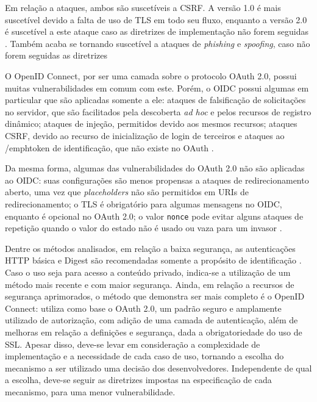 Em relação a ataques, ambos são suscetíveis a CSRF. A versão 1.0 é mais suscetível devido a 
falta de uso de TLS em todo seu fluxo, enquanto a versão 2.0 é suscetível a este ataque caso as 
diretrizes de implementação não forem seguidas \cite{FETT2016}. Também acaba se tornando suscetível 
a ataques de \emph{phishing} e \emph{spoofing}, caso não forem seguidas as diretrizes \cite{RFC6819}


O OpenID Connect, por ser uma camada sobre o protocolo OAuth 2.0, possui muitas vulnerabilidades 
em comum com este. Porém, o OIDC possui algumas em particular que são aplicadas somente a
ele: ataques de falsificação de solicitações no servidor, que são facilitados pela descoberta 
\emph{ad hoc} e pelos recursos de registro dinâmico; ataques de injeção, permitidos devido aos mesmos
recursos; ataques CSRF, devido ao recurso de inicialização de login de terceiros e ataques ao
/emph{token} de identificação, que não existe no OAuth \cite{FETT2017}.

Da mesma forma, algumas das vulnerabilidades do OAuth 2.0 não são aplicadas ao OIDC: 
suas configurações são menos propensas a ataques de redirecionamento aberto, uma vez que 
\emph{placeholders} não são permitidos em URIs de redirecionamento; o TLS é obrigatório para 
algumas mensagens no OIDC, enquanto é opcional no OAuth 2.0; o valor \texttt{nonce} pode evitar 
alguns ataques de repetição quando o valor do estado não é usado ou vaza para um invasor 
\cite{FETT2017}.



Dentre os métodos analisados, em relação a baixa segurança, as autenticações HTTP básica e Digest são 
recomendadas somente a propósito de identificação \cite{RFC2617}. Caso o uso seja para acesso a 
conteúdo privado, indica-se a utilização de um método mais recente e com maior segurança. Ainda, em
relação a recursos de segurança aprimorados, o método que demonstra ser mais completo é o OpenID
Connect: utiliza como base o OAuth 2.0, um padrão seguro e amplamente utilizado 
de autorização, com adição de uma camada de autenticação, além de melhoras em relação a definições 
e segurança, dada a obrigatoriedade do uso de SSL. Apesar disso, deve-se levar em consideração a 
complexidade de implementação e a necessidade de cada caso de uso, tornando a escolha do mecanismo
a ser utilizado uma decisão dos desenvolvedores. Independente de qual a escolha, deve-se seguir as
diretrizes impostas na especificação de cada mecanismo, para uma menor vulnerabilidade.